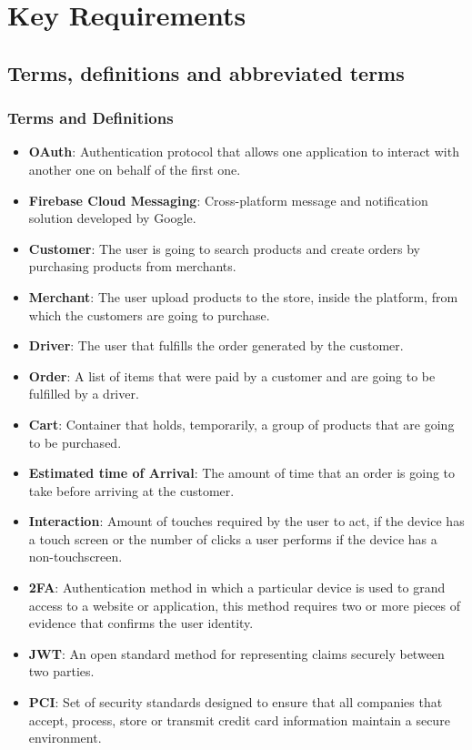 \section{Key Requirements}
\subsection{Terms, definitions and abbreviated terms}
\subsubsection{Terms and Definitions}
\begin{itemize}
    \item \textbf{OAuth}: Authentication protocol that allows one application 
    to interact with another one on behalf of the first one.
    \item \textbf{Firebase Cloud Messaging}: Cross-platform message and 
    notification solution developed by Google.
    \item \textbf{Customer}: The user is going to search products and create 
    orders by purchasing products from merchants.
    \item \textbf{Merchant}: The user upload products to the store, inside 
    the platform, from which the customers are going to purchase. 
    \item \textbf{Driver}: The user that fulfills the order generated by 
    the customer. 
    \item \textbf{Order}: A list of items that were paid by a customer and 
    are going to be fulfilled by a driver.
    \item \textbf{Cart}: Container that holds, temporarily, a group of 
    products that are going to be purchased.
    \item \textbf{Estimated time of Arrival}: The amount of time that an 
    order is going to take before arriving at the customer.
    \item \textbf{Interaction}: Amount of touches required by the user to 
    act, if the device has a touch screen or the number of clicks a user 
    performs if the device has a non-touchscreen.
    \item \textbf{2FA}: Authentication method in which a particular device is 
    used to grand access to a website or application, this method requires 
    two or more pieces of evidence that confirms the user identity.
    \item \textbf{JWT}: An open standard method for representing claims 
    securely between two parties.
    \item \textbf{PCI}: Set of security standards designed to ensure that 
    all companies that accept, process, store or transmit credit card 
    information maintain a secure environment. \cite{pci}
\end{itemize}
